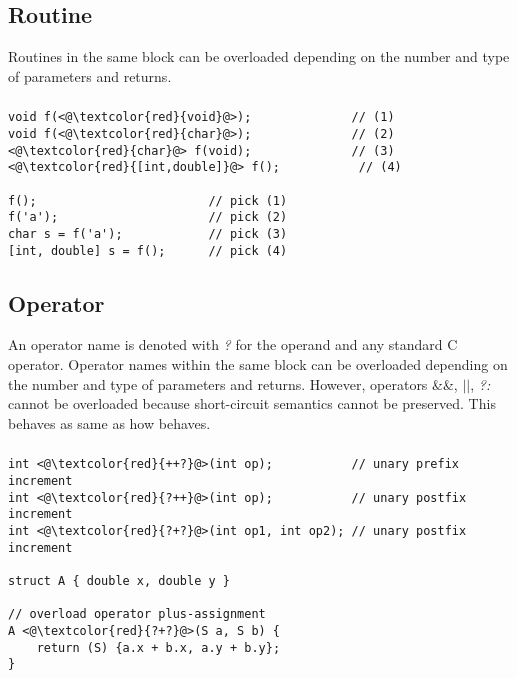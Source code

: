 \subsection{Routine}
Routines in the same block can be overloaded depending on the number and type of
parameters and returns.
\begin{frame}
\frametitle{}
\begin{lstlisting}
void f(<@\textcolor{red}{void}@>);              // (1)
void f(<@\textcolor{red}{char}@>);              // (2)
<@\textcolor{red}{char}@> f(void);              // (3)
<@\textcolor{red}{[int,double]}@> f();           // (4)

f();                        // pick (1)
f('a');                     // pick (2)
char s = f('a');            // pick (3)
[int, double] s = f();      // pick (4)
\end{lstlisting}
\end{frame}

\subsection{Operator}
An operator name is denoted with \textit{?} for the operand and any standard C
operator. Operator names within the same block can be overloaded depending on
the number and type of parameters and returns. However, operators \&\&,
$\vert\vert$, \textit{?:} cannot be overloaded because short-circuit semantics
cannot be preserved. This behaves as same as how \CCS behaves.
\begin{frame}
\frametitle{}
\begin{lstlisting}
int <@\textcolor{red}{++?}@>(int op);           // unary prefix increment
int <@\textcolor{red}{?++}@>(int op);           // unary postfix increment
int <@\textcolor{red}{?+?}@>(int op1, int op2); // unary postfix increment

struct A { double x, double y }

// overload operator plus-assignment
A <@\textcolor{red}{?+?}@>(S a, S b) {
    return (S) {a.x + b.x, a.y + b.y};
}
\end{lstlisting}
\end{frame}
